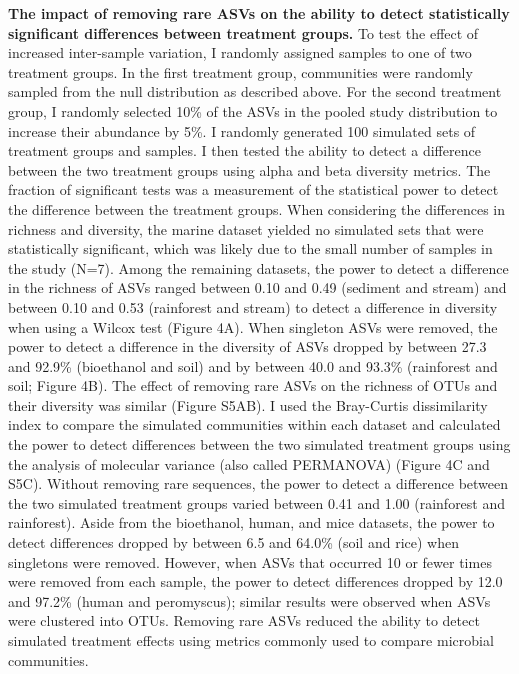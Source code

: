 \documentclass[]{article}
\begin{document}
\textbf{The impact of removing rare ASVs on the ability to detect
statistically significant differences between treatment groups.} To test
the effect of increased inter-sample variation, I randomly assigned
samples to one of two treatment groups. In the first treatment group,
communities were randomly sampled from the null distribution as
described above. For the second treatment group, I randomly selected
10\% of the ASVs in the pooled study distribution to increase their
abundance by 5\%. I randomly generated 100 simulated sets of treatment
groups and samples. I then tested the ability to detect a difference
between the two treatment groups using alpha and beta diversity metrics.
The fraction of significant tests was a measurement of the statistical
power to detect the difference between the treatment groups. When
considering the differences in richness and diversity, the marine
dataset yielded no simulated sets that were statistically significant,
which was likely due to the small number of samples in the study (N=7).
Among the remaining datasets, the power to detect a difference in the
richness of ASVs ranged between 0.10 and 0.49 (sediment and stream) and
between 0.10 and 0.53 (rainforest and stream) to detect a difference in
diversity when using a Wilcox test (Figure 4A). When singleton ASVs were
removed, the power to detect a difference in the diversity of ASVs
dropped by between 27.3 and 92.9\% (bioethanol and soil) and by between
40.0 and 93.3\% (rainforest and soil; Figure 4B). The effect of removing
rare ASVs on the richness of OTUs and their diversity was similar
(Figure S5AB). I used the Bray-Curtis dissimilarity index to compare the
simulated communities within each dataset and calculated the power to
detect differences between the two simulated treatment groups using the
analysis of molecular variance (also called PERMANOVA) (Figure 4C and
S5C). Without removing rare sequences, the power to detect a difference
between the two simulated treatment groups varied between 0.41 and 1.00
(rainforest and rainforest). Aside from the bioethanol, human, and mice
datasets, the power to detect differences dropped by between 6.5 and
64.0\% (soil and rice) when singletons were removed. However, when ASVs
that occurred 10 or fewer times were removed from each sample, the power
to detect differences dropped by 12.0 and 97.2\% (human and peromyscus);
similar results were observed when ASVs were clustered into OTUs.
Removing rare ASVs reduced the ability to detect simulated treatment
effects using metrics commonly used to compare microbial communities.
\end{document}
